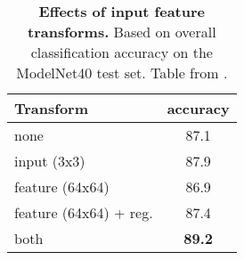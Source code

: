 \begin{table}[!ht]
    \centering
    \begin{tabular}{l|c}
        Transform & accuracy \\ \hline \hline
        none & 87.1 \\ \hline

        input (3x3) & 87.9 \\
        feature (64x64) & 86.9 \\
        feature (64x64) + reg. & 87.4 \\ \hline

        both & \textbf{89.2}
    \end{tabular}%
    \caption{
        \textbf{Effects of input feature transforms.} Based on overall classification accuracy on the ModelNet40 \cite{wu20153d} test set.
        Table from \cite{qi2017pointnet}.
    } \label{table:transforms}
\end{table}

